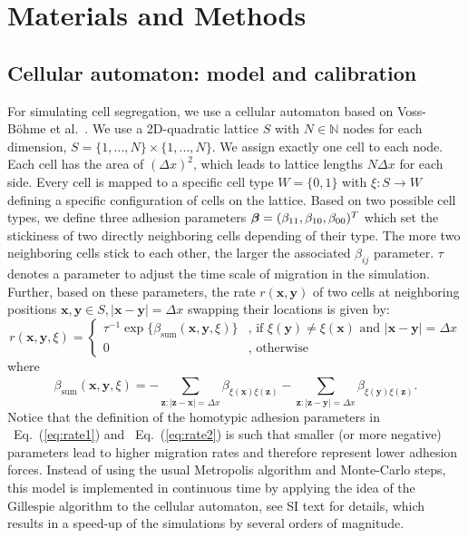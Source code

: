 \documentclass[10pt,letterpaper]{article}
\renewcommand{\eqref}[1]{Eq.~(\ref{eq:#1})}
\begin{document}
\section*{Materials and Methods}

\subsection*{Cellular automaton: model and calibration}

For simulating cell segregation, we use a cellular automaton based on
Voss-B\"ohme et al.~\cite{VosDeu2010}. We use a 2D-quadratic lattice
$S$ with $N\in\mathbb{N}$ nodes for each dimension,
$S=\{1,...,N\}\times \{1,...,N\}$. We assign exactly one cell to each
node. Each cell has the area of $(\Delta x)^2$, which leads to lattice
lengths $N\Delta x$ for each side. Every cell is mapped to a specific
cell type $W=\{0,1\}$ with $\xi:S\rightarrow W$ defining a specific
configuration of cells on the lattice. Based on two possible cell
types, we define three adhesion parameters
$\text{\boldmath$\beta$}=(\beta_{11}, \beta_{10}, \beta_{00})^T$ which
set the stickiness of two directly neighboring cells depending of
their type. The more two neighboring cells stick to each other, the
larger the associated $\beta_{ij}$ parameter. $\tau$ denotes a
parameter to adjust the time scale of migration in the simulation.
Further, based on these parameters, the rate $r(\textbf{x},\textbf{y})$ of two
cells at neighboring positions
$\textbf{x},\textbf{y} \in S, |\textbf{x}-\textbf{y}|=\Delta x$
swapping their locations is given by:
%
\begin{equation}
  \label{eq:rate1}
  r(\textbf{x},\textbf{y},\xi)=
    \begin{cases}
      \tau^{-1}\exp\{\beta_\text{sum}(\textbf{x},\textbf{y},\xi)\}&\text{, if } \xi(\textbf{y}) \neq \xi(\textbf{x}) \text{ and } |\textbf{x}-\textbf{y}|=\Delta x \\
      0&\text{, otherwise}
    \end{cases}
\end{equation}
%
where
%
\begin{equation}
  \label{eq:rate2}
    \beta_\text{sum}(\textbf{x},\textbf{y},\xi)=-\sum_{\textbf{z}:|\textbf{z}-\textbf{x}|=\Delta x}^{} \beta_{\xi(\textbf{x})\xi(\textbf{z})} - \sum_{\textbf{z}:|\textbf{z}-\textbf{y}|=\Delta x}^{} \beta_{\xi(\textbf{y})\xi(\textbf{z})}\text{.}
\end{equation}
%
Notice that the definition of the homotypic adhesion parameters in
~\eqref{rate1} and ~\eqref{rate2} is such that smaller (or more negative) parameters lead
to higher migration rates and therefore represent lower adhesion forces.
Instead of using the usual Metropolis algorithm and Monte-Carlo steps,
this model is implemented in continuous time by applying the idea of
the Gillespie algorithm to the cellular automaton, see SI text for
details, which results in a speed-up of the simulations by several
orders of magnitude.
\end{document}
